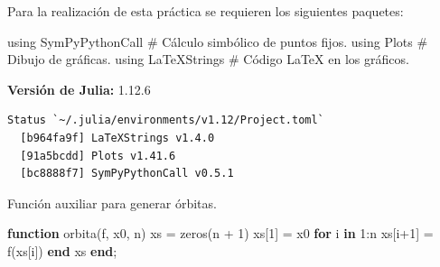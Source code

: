 \documentclass[
  spanish,
  a4paper,
]{scrreport}
\newenvironment{Shaded}{\begin{snugshade}}{\end{snugshade}}
\newcommand{\BuiltInTok}[1]{\textcolor[rgb]{0.00,0.23,0.31}{#1}}
\newcommand{\CommentTok}[1]{\textcolor[rgb]{0.37,0.37,0.37}{#1}}
\newcommand{\ControlFlowTok}[1]{\textcolor[rgb]{0.00,0.23,0.31}{\textbf{#1}}}
\newcommand{\FloatTok}[1]{\textcolor[rgb]{0.68,0.00,0.00}{#1}}
\newcommand{\FunctionTok}[1]{\textcolor[rgb]{0.28,0.35,0.67}{#1}}
\newcommand{\ImportTok}[1]{\textcolor[rgb]{0.00,0.46,0.62}{#1}}
\newcommand{\KeywordTok}[1]{\textcolor[rgb]{0.00,0.23,0.31}{\textbf{#1}}}
\newcommand{\NormalTok}[1]{\textcolor[rgb]{0.00,0.23,0.31}{#1}}
\newcommand{\OperatorTok}[1]{\textcolor[rgb]{0.37,0.37,0.37}{#1}}
\theoremstyle{definition}
\theoremstyle{remark}
\begin{document}
Para la realización de esta práctica se requieren los siguientes
paquetes:

\begin{Shaded}
\begin{Highlighting}[]
\ImportTok{using} \BuiltInTok{SymPyPythonCall}  \CommentTok{\# Cálculo simbólico de puntos fijos.}
\ImportTok{using} \BuiltInTok{Plots}            \CommentTok{\# Dibujo de gráficas.}
\ImportTok{using} \BuiltInTok{LaTeXStrings}     \CommentTok{\# Código LaTeX en los gráficos.}
\end{Highlighting}
\end{Shaded}

\begin{tcolorbox}[enhanced jigsaw, arc=.35mm, bottomrule=.15mm, bottomtitle=1mm, breakable, colback=white, colbacktitle=quarto-callout-note-color!10!white, colframe=quarto-callout-note-color-frame, coltitle=black, left=2mm, leftrule=.75mm, opacityback=0, opacitybacktitle=0.6, rightrule=.15mm, title=\textcolor{quarto-callout-note-color}{\faInfo}\hspace{0.5em}{Versiones de Julia y de los paquetes utilizados}, titlerule=0mm, toprule=.15mm, toptitle=1mm]

\textbf{Versión de Julia:} 1.12.6

\begin{verbatim}
Status `~/.julia/environments/v1.12/Project.toml`
  [b964fa9f] LaTeXStrings v1.4.0
  [91a5bcdd] Plots v1.41.6
  [bc8888f7] SymPyPythonCall v0.5.1
\end{verbatim}

\end{tcolorbox}

Función auxiliar para generar órbitas.

\begin{Shaded}
\begin{Highlighting}[]
\KeywordTok{function} \FunctionTok{orbita}\NormalTok{(f, x0, n)}
\NormalTok{    xs }\OperatorTok{=} \FunctionTok{zeros}\NormalTok{(n }\OperatorTok{+} \FloatTok{1}\NormalTok{)}
\NormalTok{    xs[}\FloatTok{1}\NormalTok{] }\OperatorTok{=}\NormalTok{ x0}
    \ControlFlowTok{for}\NormalTok{ i }\KeywordTok{in} \FloatTok{1}\OperatorTok{:}\NormalTok{n}
\NormalTok{        xs[i}\OperatorTok{+}\FloatTok{1}\NormalTok{] }\OperatorTok{=} \FunctionTok{f}\NormalTok{(xs[i])}
    \ControlFlowTok{end}
\NormalTok{    xs}
\KeywordTok{end}\NormalTok{;}
\end{Highlighting}
\end{Shaded}
\end{document}
